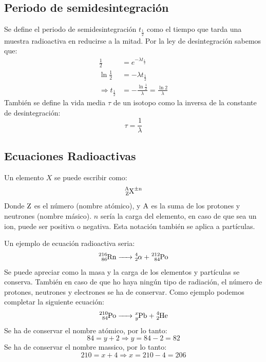 \documentclass[arial,a4paper,print]{article}
\begin{document}
\subsection{Periodo de semidesintegración}
Se define el periodo de semidesintegración $t_{\frac12}$ como el tiempo que tarda una muestra radioactiva en reducirse a la mitad. Por la ley de desintegración sabemos que:
\begin{align*}
	\frac{1}{2} &= e^{-\lambda t_{\frac12}} \\
	\ln\frac12 &= -\lambda t_{\frac12}\\
	\Rightarrow t_{\frac12} &= -\frac{\ln\frac12}{\lambda} = \frac{\ln2}{\lambda}
\end{align*}
También se define la vida media $\tau$ de un isotopo como la inversa de la constante de desintegración:
\begin{equation*}
	\tau = \frac1\lambda
\end{equation*}

\subsection{Ecuaciones Radioactivas}
Un elemento $X$ se puede escribir como:
\begin{equation*}
	\ce{^A_ZX^{\pm n}}
\end{equation*}
Donde $\ce{Z}$ es el número (nombre atómico), y $\ce{A}$ es la suma de los protones y neutrones (nombre másico). $n$ sería la carga del elemento, en caso de que sea un ion, puede ser positiva o negativa. Esta notación también se aplica a partículas. 

Un ejemplo de ecuación radioactiva seria:
\begin{equation*}
	\ce{^216_{86}Rn -> ^4_2\alpha_ + ^212_84Po}
\end{equation*}
Se puede apreciar como la masa y la carga de los elementos y partículas se conserva. También en caso de que ho haya ningún tipo de radiación, el número de protones, neutrones y electrones se ha de conservar. Como ejemplo podemos completar la siguiente ecuación:
\begin{equation*}
	\ce{^{210}_{84}Po -> ^{x}_{y}Pb + ^{4}_{2}He}
\end{equation*}
Se ha de conservar el nombre atómico, por lo tanto:
\begin{equation*}
	84 = y + 2 \Rightarrow y = 84-2=82
\end{equation*}
Se ha de conservar el nombre massico, por lo tanto:
\begin{equation*}
	210 = x+ 4 \Rightarrow x = 210 -4=206
\end{equation*}
\end{document}
